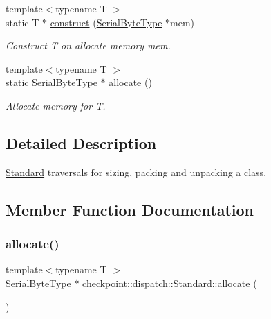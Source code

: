 \begin{DoxyCompactItemize}
{\footnotesize template$<$typename T $>$ }\\static T $\ast$ \hyperlink{structcheckpoint_1_1dispatch_1_1_standard_a532b9767431c5a8515205209474aca11}{construct} (\hyperlink{namespacecheckpoint_ae57f01cdc0b81776c23b6c7c934c58f5}{Serial\+Byte\+Type} $\ast$mem)
\begin{DoxyCompactList}\small\item\em Construct {\ttfamily T} on allocate memory {\ttfamily mem}. \end{DoxyCompactList}\item 
{\footnotesize template$<$typename T $>$ }\\static \hyperlink{namespacecheckpoint_ae57f01cdc0b81776c23b6c7c934c58f5}{Serial\+Byte\+Type} $\ast$ \hyperlink{structcheckpoint_1_1dispatch_1_1_standard_a289fce710a512a3dbbd96076ed8d721e}{allocate} ()
\begin{DoxyCompactList}\small\item\em Allocate memory for {\ttfamily T}. \end{DoxyCompactList}\end{DoxyCompactItemize}


\subsection{Detailed Description}
\hyperlink{structcheckpoint_1_1dispatch_1_1_standard}{Standard} traversals for sizing, packing and unpacking a class. 

\subsection{Member Function Documentation}
\mbox{\label{structcheckpoint_1_1dispatch_1_1_standard_a289fce710a512a3dbbd96076ed8d721e}} 
\subsubsection{\texorpdfstring{allocate()}{allocate()}}
{\footnotesize\ttfamily template$<$typename T $>$ \\
\hyperlink{namespacecheckpoint_ae57f01cdc0b81776c23b6c7c934c58f5}{Serial\+Byte\+Type} $\ast$ checkpoint\+::dispatch\+::\+Standard\+::allocate (\begin{DoxyParamCaption}{ }\end{DoxyParamCaption})\hspace{0.3cm}{\ttfamily [static]}}




